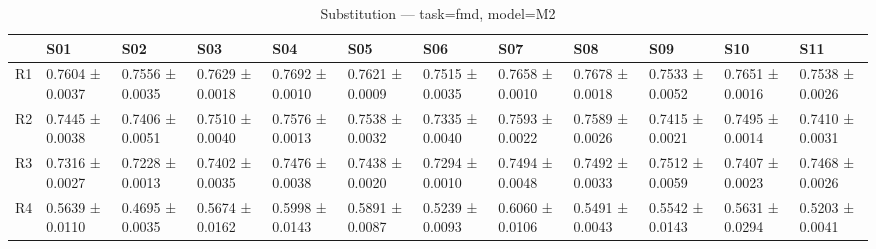 \begin{table}[htbp]
\centering
\caption{Substitution — task=fmd, model=M2}
\label{tab:sub:fmd:M2}
\begin{tabular}{llllllllllll}
\toprule
\toprule
 & S01 & S02 & S03 & S04 & S05 & S06 & S07 & S08 & S09 & S10 & S11 \\
\midrule
\midrule
R1 & 0.7604 ± 0.0037 & 0.7556 ± 0.0035 & 0.7629 ± 0.0018 & 0.7692 ± 0.0010 & 0.7621 ± 0.0009 & 0.7515 ± 0.0035 & 0.7658 ± 0.0010 & 0.7678 ± 0.0018 & 0.7533 ± 0.0052 & 0.7651 ± 0.0016 & 0.7538 ± 0.0026 \\
R2 & 0.7445 ± 0.0038 & 0.7406 ± 0.0051 & 0.7510 ± 0.0040 & 0.7576 ± 0.0013 & 0.7538 ± 0.0032 & 0.7335 ± 0.0040 & 0.7593 ± 0.0022 & 0.7589 ± 0.0026 & 0.7415 ± 0.0021 & 0.7495 ± 0.0014 & 0.7410 ± 0.0031 \\
R3 & 0.7316 ± 0.0027 & 0.7228 ± 0.0013 & 0.7402 ± 0.0035 & 0.7476 ± 0.0038 & 0.7438 ± 0.0020 & 0.7294 ± 0.0010 & 0.7494 ± 0.0048 & 0.7492 ± 0.0033 & 0.7512 ± 0.0059 & 0.7407 ± 0.0023 & 0.7468 ± 0.0026 \\
R4 & 0.5639 ± 0.0110 & 0.4695 ± 0.0035 & 0.5674 ± 0.0162 & 0.5998 ± 0.0143 & 0.5891 ± 0.0087 & 0.5239 ± 0.0093 & 0.6060 ± 0.0106 & 0.5491 ± 0.0043 & 0.5542 ± 0.0143 & 0.5631 ± 0.0294 & 0.5203 ± 0.0041 \\
\bottomrule
\end{tabular}\end{table}
